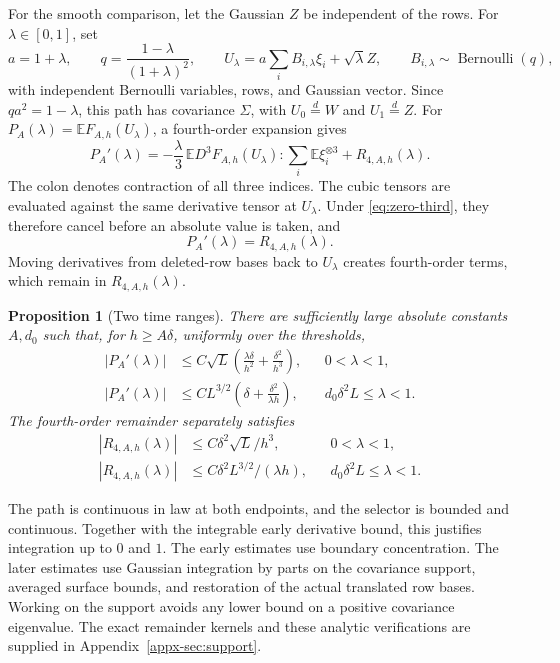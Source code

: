 \documentclass[11pt,letterpaper]{article}
\newtheorem{proposition}{Proposition}
\theoremstyle{remark}
\newcommand{\E}{\mathbb E}
\begin{document}
For the smooth comparison, let the Gaussian \(Z\) be independent of
the rows. For \(\lambda\in[0,1]\), set
\begin{equation}
 a=1+\lambda,\qquad q=\frac{1-\lambda}{(1+\lambda)^2},\qquad
 U_\lambda=a\sum_i B_{i,\lambda}\xi_i+\sqrt\lambda Z,
 \qquad B_{i,\lambda}\sim\operatorname{Bernoulli}(q),
 \label{eq:path}
\end{equation}
with independent Bernoulli variables, rows, and Gaussian vector.
Since \(qa^2=1-\lambda\), this path has covariance \(\Sigma\),
with \(U_0\stackrel d=W\) and \(U_1\stackrel d=Z\).
For \(P_A(\lambda)=\E F_{A,h}(U_\lambda)\), a fourth-order expansion gives
\begin{equation}
 P_A'(\lambda)=-\frac\lambda3\,
 \E D^3F_{A,h}(U_\lambda):\sum_i\E\xi_i^{\otimes3}
 +R_{4,A,h}(\lambda).
 \label{eq:path-summary}
\end{equation}
The colon denotes contraction of all three indices. The cubic tensors
are evaluated against the same derivative tensor at \(U_\lambda\).
Under \eqref{eq:zero-third}, they therefore cancel before an absolute
value is taken, and
\begin{equation}
 P_A'(\lambda)=R_{4,A,h}(\lambda).
 \label{zs:identity}
\end{equation}
Moving derivatives from deleted-row bases back to \(U_\lambda\)
creates fourth-order terms, which remain in \(R_{4,A,h}(\lambda)\).

\begin{proposition}[Two time ranges]\label{an:prop:derivative}
There are sufficiently large absolute constants \(A,d_0\) such that,
for \(h\ge A\delta\), uniformly over the thresholds,
\begin{align}
 |P_A'(\lambda)|&\le C\sqrt L\left(
 \frac{\lambda\delta}{h^2}+\frac{\delta^2}{h^3}\right),
 &&0<\lambda<1,\label{an:early}\\
 |P_A'(\lambda)|&\le CL^{3/2}\left(
 \delta+\frac{\delta^2}{\lambda h}\right),
 &&d_0\delta^2L\le\lambda<1.\label{an:late}
\end{align}
The fourth-order remainder separately satisfies
\begin{align}
 |R_{4,A,h}(\lambda)|&\le C\delta^2\sqrt L/h^3,
 &&0<\lambda<1,\label{eq:remainder-early}\\
 |R_{4,A,h}(\lambda)|&\le C\delta^2L^{3/2}/(\lambda h),
 &&d_0\delta^2L\le\lambda<1.\label{an:remainder}
\end{align}
\end{proposition}
The path is continuous in law at both endpoints, and the selector is
bounded and continuous. Together with the integrable early derivative
bound, this justifies integration up to \(0\) and \(1\).
The early estimates use boundary concentration. The later estimates
use Gaussian integration by parts on the covariance support, averaged
surface bounds, and restoration of the actual translated row bases.
Working on the support avoids any lower bound on a positive covariance
eigenvalue. The exact remainder kernels and these analytic verifications
are supplied in Appendix~\ref{appx-sec:support}.
\end{document}
